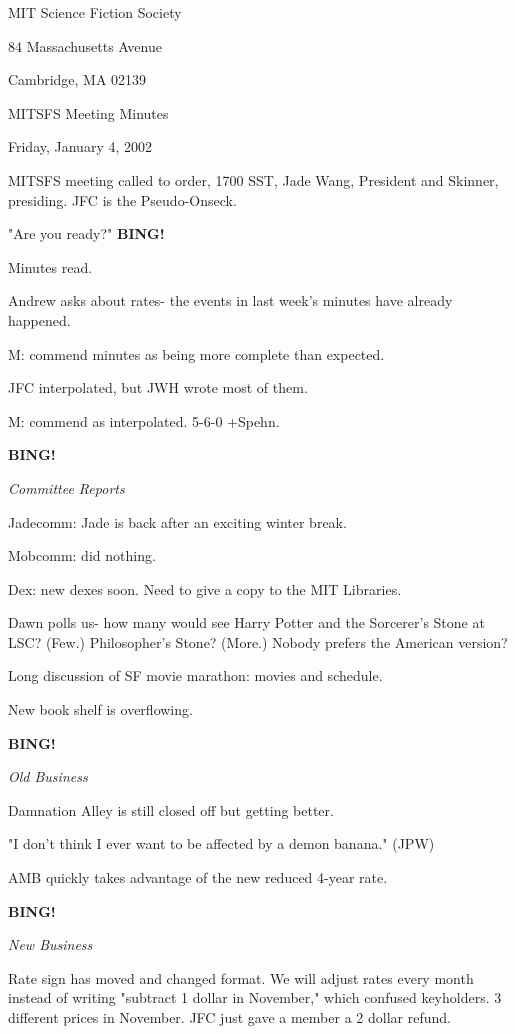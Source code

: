 \documentclass[12pt]{article}
\newcommand{\bing}{{\bf BING!} }
\newcommand{\goto}[1]{\bing \vskip 12pt \centerline{{\em{#1}}}}
\begin{document}
\begin{center}

MIT Science Fiction Society 

84 Massachusetts Avenue

Cambridge, MA 02139

\vspace{12pt}

MITSFS Meeting Minutes 

Friday, January 4, 2002

\end{center}
 
\vspace{18pt}

\setlength{\parskip}{6pt}

\noindent
MITSFS meeting called to order, 1700 SST, Jade Wang, President and Skinner, presiding. JFC is the Pseudo-Onseck.

"Are you ready?" \bing

Minutes read.

Andrew asks about rates- the events in last week's minutes have already happened.

M: commend minutes as being more complete than expected.

JFC interpolated, but JWH wrote most of them.

M: commend as interpolated. 5-6-0 +Spehn.

\goto{Committee Reports}

Jadecomm: Jade is back after an exciting winter break.

Mobcomm: did nothing.

Dex: new dexes soon. Need to give a copy to the MIT Libraries.

Dawn polls us- how many would see Harry Potter and the Sorcerer's Stone at LSC? (Few.) Philosopher's Stone? (More.) Nobody prefers the American version?

Long discussion of SF movie marathon: movies and schedule.

New book shelf is overflowing.

\goto{Old Business}

Damnation Alley is still closed off but getting better.

"I don't think I ever want to be affected by a demon banana." (JPW)

AMB quickly takes advantage of the new reduced 4-year rate.

\goto{New Business}

Rate sign has moved and changed format. We will adjust rates every month instead of writing "subtract 1 dollar in November," which confused keyholders. 3 different prices in November. JFC just gave a member a 2 dollar refund.
\end{document}
